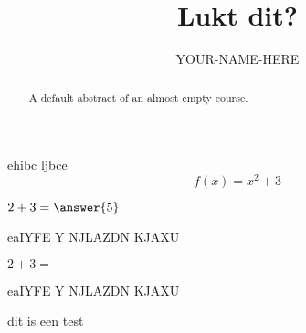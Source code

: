 \documentclass{ximera}
\title{Lukt dit?}
\author{YOUR-NAME-HERE}
\begin{document}
\begin{abstract}
    A default abstract of an almost empty course.
\end{abstract}
\maketitle

\begin{example}
    ehibc ljbce 
    \[ f(x)=x^2+3 \]
\end{example}

\begin{exercise}
    $2+3=\answer{5}$
    \begin{solution}
        eaIYFE Y NJLAZDN KJAXU
    \end{solution}
\end{exercise}
\begin{exercise}
    $2+3=$
    \begin{oplossing}[toon]
        eaIYFE Y NJLAZDN KJAXU
    \end{oplossing}
\end{exercise}

\begin{definition}
    dit is een test
\end{definition}
\end{document}
